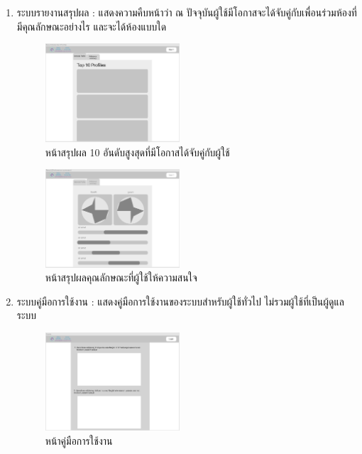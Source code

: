 \begin{enumerate}
  \item ระบบรายงานสรุปผล : แสดงความคืบหน้าว่า ณ ปัจจุบันผู้ใช้มีโอกาสจะได้จับคู่กับเพื่อนร่วมห้องที่มีคุณลักษณะอย่างไร 
        และจะได้ห้องแบบใด 
  \begin{figure}[h]
  \begin{center}
  \includegraphics[width=50mm,scale=0.5]{photo/resultSelectedProfile.png}
  \end{center}
  \caption{หน้าสรุปผล 10 อันดับสูงสุดที่มีโอกาสได้จับคู่กับผู้ใช้}
  \label{fig:select-profile}
  \end{figure}
  \begin{figure}[h]
  \begin{center}
  \includegraphics[width=50mm,scale=0.5]{photo/resultPreferenceSummary.png}
  \end{center}
  \caption{หน้าสรุปผลคุณลักษณะที่ผู้ใช้ให้ความสนใจ}
  \label{fig:summary}
  \end{figure}

  \item ระบบคู่มือการใช้งาน : แสดงคู่มือการใช้งานของระบบสำหรับผู้ใช้ทั่วไป ไม่รวมผู้ใช้ที่เป็นผู้ดูแลระบบ
  \begin{figure}[h]
  \begin{center}
  \includegraphics[width=50mm,scale=0.5]{photo/Guideline.png}
  \end{center}
  \caption{หน้าคู่มือการใช้งาน}
  \label{fig:guideline}
  \end{figure}


\end{enumerate}
